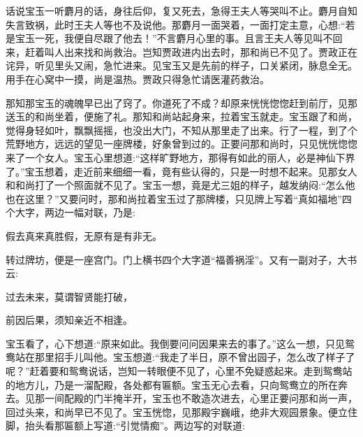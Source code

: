 


\begin{parag}
    话说宝玉一听麝月的话，身往后仰，复又死去，急得王夫人等哭叫不止。麝月自知失言致祸，此时王夫人等也不及说他。那麝月一面哭着，一面打定主意，心想:“若是宝玉一死，我便自尽跟了他去！”不言麝月心里的事。且言王夫人等见叫不回来，赶着叫人出来找和尚救治。岂知贾政进内出去时，那和尚已不见了。贾政正在诧异，听见里头又闹，急忙进来。见宝玉又是先前的样子，口关紧闭，脉息全无。用手在心窝中一摸，尚是温热。贾政只得急忙请医灌药救治。
\end{parag}


\begin{parag}
    那知那宝玉的魂魄早已出了窍了。你道死了不成？却原来恍恍惚惚赶到前厅，见那送玉的和尚坐着，便施了礼。那知和尚站起身来，拉着宝玉就走。宝玉跟了和尚，觉得身轻如叶，飘飘摇摇，也没出大门，不知从那里走了出来。行了一程，到了个荒野地方，远远的望见一座牌楼，好象曾到过的。正要问那和尚时，只见恍恍惚惚来了一个女人。宝玉心里想道:“这样旷野地方，那得有如此的丽人，必是神仙下界了。”宝玉想着，走近前来细细一看，竟有些认得的，只是一时想不起来。见那女人和和尚打了一个照面就不见了。宝玉一想，竟是尤三姐的样子，越发纳闷:“怎么他也在这里？”又要问时，那和尚拉着宝玉过了那牌楼，只见牌上写着“真如福地”四个大字，两边一幅对联，乃是:
\end{parag}


\begin{poem}
    \begin{pl}
        假去真来真胜假，无原有是有非无。
    \end{pl}
\end{poem}


\begin{parag}
    转过牌坊，便是一座宫门。门上横书四个大字道“福善祸淫”。又有一副对子，大书云:
\end{parag}


\begin{poem}
    \begin{pl}
        过去未来，莫谓智贤能打破，
    \end{pl}


    \begin{pl}
        前因后果，须知亲近不相逢。
    \end{pl}

\end{poem}


\begin{parag}
    宝玉看了，心下想道:“原来如此。我倒要问问因果来去的事了。”这么一想，只见鸳鸯站在那里招手儿叫他。宝玉想道:“我走了半日，原不曾出园子，怎么改了样子了呢？”赶着要和鸳鸯说话，岂知一转眼便不见了，心里不免疑惑起来。走到鸳鸯站的地方儿，乃是一溜配殿，各处都有匾额。宝玉无心去看，只向鸳鸯立的所在奔去。见那一间配殿的门半掩半开，宝玉也不敢造次进去，心里正要问那和尚一声，回过头来，和尚早已不见了。宝玉恍惚，见那殿宇巍峨，绝非大观园景象。便立住脚，抬头看那匾额上写道:“引觉情痴”。两边写的对联道:
\end{parag}


